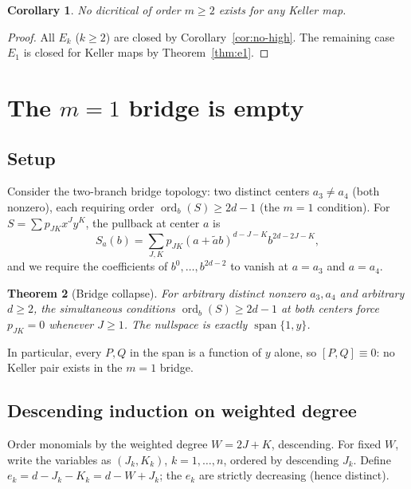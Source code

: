 \documentclass[a4paper,11pt]{article}
\theoremstyle{plain}
\newtheorem{theorem}{Theorem}[section]
\newtheorem{corollary}[theorem]{Corollary}
\theoremstyle{definition}
\theoremstyle{remark}
\begin{document}
\begin{corollary}\label{cor:m2-done}
No dicritical of order $m\geq 2$ exists for any Keller map.
\end{corollary}

\begin{proof}
All $E_k$ ($k\geq 2$) are closed by Corollary~\ref{cor:no-high}. The remaining case $E_1$ is closed for Keller maps by Theorem~\ref{thm:e1}.
\end{proof}

\section{The \texorpdfstring{$m=1$}{m=1} bridge is empty}\label{sec:m1}

\subsection{Setup}

Consider the two-branch bridge topology: two distinct centers $a_3\neq a_4$ (both nonzero), each requiring order $\operatorname{ord}_b(S)\geq 2d-1$ (the $m=1$ condition). For $S=\sum p_{JK}x^Jy^K$, the pullback at center $a$ is
\begin{equation}\label{eq:bridge-pullback}
S_a(b)=\sum_{J,K}p_{JK}(a+\tilde{a}b)^{d-J-K}b^{2d-2J-K},
\end{equation}
and we require the coefficients of $b^0,\dots,b^{2d-2}$ to vanish at $a=a_3$ and $a=a_4$.

\begin{theorem}[Bridge collapse]\label{thm:bridge}
For arbitrary distinct nonzero $a_3,a_4$ and arbitrary $d\geq 2$, the simultaneous conditions $\operatorname{ord}_b(S)\geq 2d-1$ at both centers force $p_{JK}=0$ whenever $J\geq 1$. The nullspace is exactly $\operatorname{span}\{1,y\}$.
\end{theorem}

In particular, every $P,Q$ in the span is a function of $y$ alone, so $[P,Q]\equiv 0$: no Keller pair exists in the $m=1$ bridge.

\subsection{Descending induction on weighted degree}

Order monomials by the weighted degree $W=2J+K$, descending. For fixed $W$, write the variables as $(J_k,K_k)$, $k=1,\dots,n$, ordered by descending $J_k$. Define $e_k=d-J_k-K_k=d-W+J_k$; the $e_k$ are strictly decreasing (hence distinct).
\end{document}
